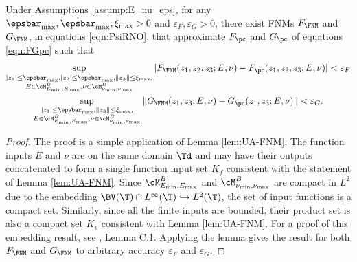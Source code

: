 \documentclass[letterpaper,11pt]{article}
\begin{document}
\begin{lemma}\label{lem:UA-hom}
    Under Assumptions \ref{assump:E_nu_eps}, for any $\epsbar_{\max}, \dot{\epsbar}_{\max}, \xi_{\max} > 0$ and $\varepsilon_F, \varepsilon_G > 0$, there exist FNMs $F_{\FNM}$ and $G_{\FNM}$, in equations 
    \eqref{eqn:PsiRNO}, that approximate $F_{\pc}$ and $G_{\pc}$ of equations \eqref{eqn:FGpc} such that 
    \begin{gather}
        \sup_{\substack{|z_1| \leq \epsbar_{\max}, |z_2| \leq \dot{\epsbar}_{\max}, \|z_3\|\leq \xi_{\max},\\ E \in \cM_{E_{\min}, E_{\max}}^B, \nu \in \cM_{\nu_{\min}, \nu_{\max}}^B}} |F_{\FNM}(z_1, z_2, z_3; E, \nu) - F_{\pc}(z_1, z_2, z_3; E, \nu)| < \varepsilon_F\\
        \sup_{\substack{|z_1| \leq \epsbar_{\max}, \|z_3\|\leq \xi_{\max},\\ E \in \cM_{E_{\min}, E_{\max}}^B, \nu \in \cM_{\nu_{\min}, \nu_{\max}}^B}} \|G_{\FNM}(z_1, z_3; E, \nu) - G_{\pc}(z_1, z_3; E, \nu)\| < \varepsilon_G.
    \end{gather}
\end{lemma}
\begin{proof}
The proof is a simple application of Lemma \ref{lem:UA-FNM}. The function inputs $E$ and $\nu$ are on the same domain $\Td$ and may have their outputs concatenated to form a single function input set $K_f$ consistent with the statement of Lemma \ref{lem:UA-FNM}. Since $\cM_{E_{\min}, E_{\max}}^B$ and $\cM_{\nu_{\min}, \nu_{\max}}^B$ are compact in $L^2$ due to the embedding $\BV(\T) \cap L^{\infty}(\T) \hookrightarrow L^2(\T)$, the set of input functions is a compact set. Similarly, since all the finite inputs are bounded, their product set is also a compact set $K_v$ consistent with Lemma \ref{lem:UA-FNM}. For a proof of this embedding result, see \cite{bhattacharya2024learning}, Lemma C.1.  Applying the lemma gives the result for both $F_{\FNM}$ and $G_{\FNM}$ to arbitrary accuracy $\varepsilon_F$ and $\varepsilon_G$. 
\end{proof}
\end{document}
